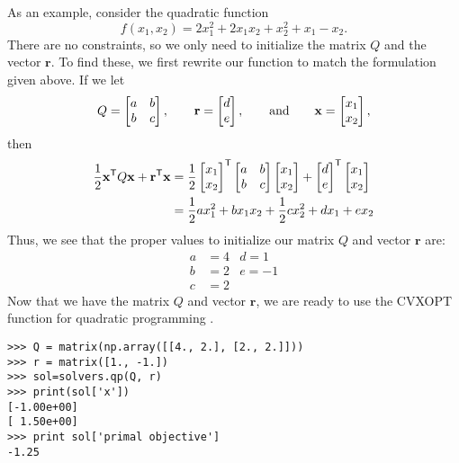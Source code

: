 As an example, consider the quadratic function
\[
f(x_1,x_2) = 2x_1^2 +2x_1x_2 + x_2^2 +x_1 -x_2.
\]
There are no constraints, so we only need to initialize the matrix $Q$ and the vector $\mathbf{r}$.
To find these, we first rewrite our function to match the formulation given above.
If we let
\[
Q = \begin{bmatrix}
  a & b\\
  b & c
\end{bmatrix}, \qquad
\mathbf{r} = \begin{bmatrix}
  d\\
  e
\end{bmatrix},
\qquad \text{and} \qquad
\mathbf{x} = \begin{bmatrix}
  x_1\\
  x_2
\end{bmatrix},
\]
then
\begin{align*}
\frac{1}{2}\mathbf{x}^{\mathsf T} Q\mathbf{x} + \mathbf{r}^{\mathsf T} \mathbf{x} &=
\frac{1}{2}
\begin{bmatrix}
  x_1\\
  x_2
\end{bmatrix}^{\mathsf T}
\begin{bmatrix}
  a & b\\
  b & c
\end{bmatrix}
\begin{bmatrix}
  x_1\\
  x_2
\end{bmatrix} +
\begin{bmatrix}
  d\\
  e
\end{bmatrix}^{\mathsf T}
\begin{bmatrix}
  x_1\\
  x_2
\end{bmatrix} \\
&= \frac{1}{2}ax_1^2 + bx_1x_2 + \frac{1}{2}cx_2^2 + dx_1 + ex_2
\end{align*}
Thus, we see that the proper values to initialize our matrix $Q$ and vector $\mathbf{r}$ are:
\begin{align*}
a &= 4  &d = 1 \\
b &= 2  &e = -1 \\
c &= 2
\end{align*}
Now that we have the matrix $Q$ and vector $\mathbf{r}$, we are ready to use the CVXOPT function for quadratic programming .
\begin{lstlisting}
>>> Q = matrix(np.array([[4., 2.], [2., 2.]]))
>>> r = matrix([1., -1.])
>>> sol=solvers.qp(Q, r)
>>> print(sol['x'])
[-1.00e+00]
[ 1.50e+00]
>>> print sol['primal objective']
-1.25
\end{lstlisting}

